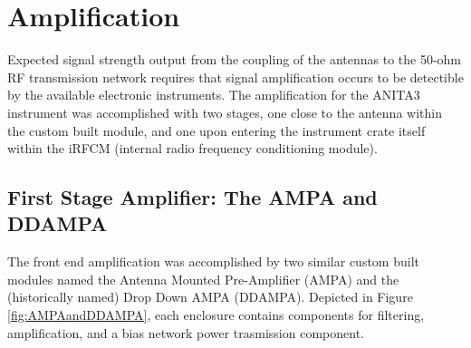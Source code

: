 \section{Amplification}
	Expected signal strength output from the coupling of the antennas to the 50-ohm RF transmission network requires that signal amplification occurs to be detectible by the available electronic instruments.  The amplification for the ANITA3 instrument was accomplished with two stages, one close to the antenna within the custom built module, and one upon entering the instrument crate itself within the iRFCM (internal radio frequency conditioning module).  
	
	\subsection{First Stage Amplifier: The AMPA and DDAMPA}
		The front end amplification was accomplished by two similar custom built modules named the Antenna Mounted Pre-Amplifier (AMPA) and the (historically named) Drop Down AMPA (DDAMPA).  Depicted in Figure \ref{fig:AMPAandDDAMPA}, each enclosure contains components for filtering, amplification, and a bias network power trasmission component.  
		
